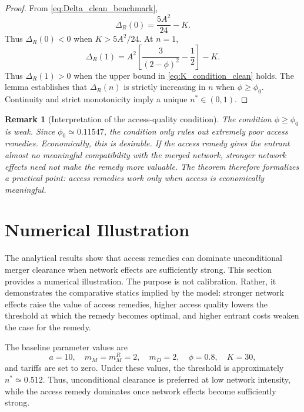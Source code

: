 \documentclass[12pt]{article}
\newtheorem{remark}{Remark}
\begin{document}
\begin{proof}
From \eqref{eq:Delta_clean_benchmark},
\begin{equation}
\Delta_R(0)=\frac{5A^2}{24}-K.
\end{equation}
Thus $\Delta_R(0)<0$ when $K>5A^2/24$. At $n=1$,
\begin{equation}
\Delta_R(1)=A^2\left[\frac{3}{(2-\phi)^2}-\frac{1}{2}\right]-K.
\end{equation}
Thus $\Delta_R(1)>0$ when the upper bound in \eqref{eq:K_condition_clean} holds. The lemma establishes that $\Delta_R(n)$ is strictly increasing in $n$ when $\phi\geq\phi_0$. Continuity and strict monotonicity imply a unique $n^*\in(0,1)$.
\end{proof}

\begin{remark}[Interpretation of the access-quality condition]
The condition $\phi\geq\phi_0$ is weak. Since $\phi_0\simeq0.11547$, the condition only rules out extremely poor access remedies. Economically, this is desirable. If the access remedy gives the entrant almost no meaningful compatibility with the merged network, stronger network effects need not make the remedy more valuable. The theorem therefore formalizes a practical point: access remedies work only when access is economically meaningful.
\end{remark}

\section{Numerical Illustration}\label{sec:numerics}

The analytical results show that access remedies can dominate unconditional merger clearance when network effects are sufficiently strong. This section provides a numerical illustration. The purpose is not calibration. Rather, it demonstrates the comparative statics implied by the model: stronger network effects raise the value of access remedies, higher access quality lowers the threshold at which the remedy becomes optimal, and higher entrant costs weaken the case for the remedy.

The baseline parameter values are
\begin{equation}
a=10,\quad m_M=m_M^R=2,\quad m_D=2,\quad \phi=0.8,\quad K=30,
\end{equation}
and tariffs are set to zero. Under these values, the threshold is approximately $n^*\simeq0.512$. Thus, unconditional clearance is preferred at low network intensity, while the access remedy dominates once network effects become sufficiently strong.
\end{document}

